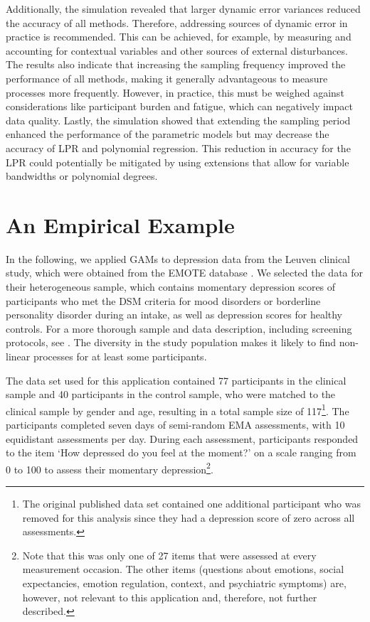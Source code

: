 \documentclass[man, floatsintext]{apa7}
\begin{document}
Additionally, the simulation revealed that larger dynamic error variances
reduced the accuracy of all methods. Therefore, addressing sources of dynamic
error in practice is recommended. This can be achieved, for example, by
measuring and accounting for contextual variables and other sources of external
disturbances. The results also indicate that increasing the sampling frequency
improved the performance of all methods, making it generally advantageous to
measure processes more frequently. However, in practice, this must be weighed
against considerations like participant burden and fatigue, which can
negatively impact data quality. Lastly, the simulation showed that extending
the sampling period enhanced the performance of the parametric models but may
decrease the accuracy of LPR and polynomial regression. This reduction in
accuracy for the LPR could potentially be mitigated by using extensions that
allow for variable bandwidths or polynomial degrees.

\section{An Empirical Example} \label{empirical_example}

In the following, we applied GAMs to depression data from the Leuven clinical
study, which were obtained from the EMOTE database
\parencite{kalokerinos_emote_nodate}. We selected the data for their
heterogeneous sample, which contains momentary depression scores of
participants who met the DSM criteria for mood disorders or borderline
personality disorder during an intake, as well as depression scores for healthy
controls. For a more thorough sample and data description, including screening
protocols, see \textcite{heininga_dynamical_2019}. The diversity in the study
population makes it likely to find non-linear processes for at least some
participants.

The data set used for this application contained 77 participants in the
clinical
sample and 40 participants in the control sample, who were matched to the
clinical sample by gender and age, resulting in a total sample size of
117\footnote{The original published data set contained one additional
  participant who was removed for this analysis since they had a depression
  score
  of zero across all assessments.}. The participants completed seven days of
semi-random EMA assessments, with 10 equidistant assessments per day. During
each assessment, participants responded to the item `How depressed do you feel
at the moment?' on a scale ranging from 0 to 100 to assess their momentary
depression\footnote{Note that this was only one of 27 items that were assessed
  at every measurement occasion. The other items (questions about emotions,
  social expectancies, emotion regulation, context, and psychiatric symptoms)
  are, however, not relevant to this application and, therefore, not further
  described.}.
\end{document}
